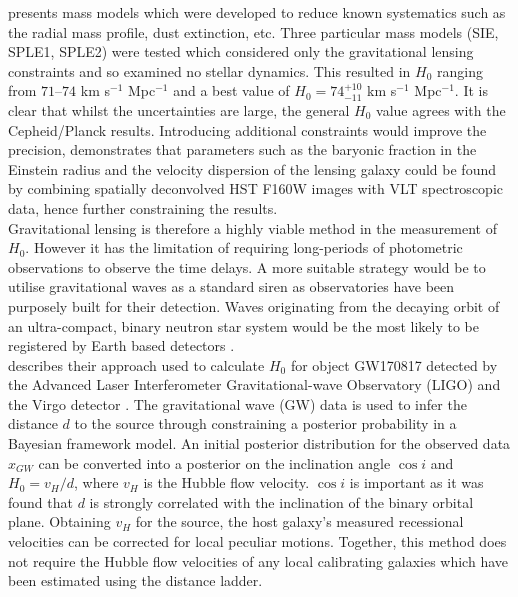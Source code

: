 \documentclass[12pt, onecolumn]{revtex4}    %
\begin{document}
\cite{2003ApJ...599...70K} presents mass models which were developed to reduce known systematics such as the radial mass profile, dust extinction, etc. Three particular mass models (SIE, SPLE1, SPLE2) were tested which considered only the gravitational lensing constraints and so examined no stellar dynamics. This resulted in $H_0$ ranging from $71$--$74$ km s$^{-1}$ Mpc$^{-1}$ and a best value of $H_0=74^{+10}_{-11}$ km s$^{-1}$ Mpc$^{-1}$. It is clear that whilst the uncertainties are large, the general $H_0$ value agrees with the Cepheid/Planck results. Introducing additional constraints would improve the precision, \cite{2011A&A...536A..53C} demonstrates that parameters such as the baryonic fraction in the Einstein radius and the velocity dispersion of the lensing galaxy could be found by combining spatially deconvolved HST F160W images with VLT spectroscopic data, hence further constraining the results. \\

Gravitational lensing is therefore a highly viable method in the measurement of $H_0$. However it has the limitation of requiring long-periods of photometric observations to observe the time delays. A more suitable strategy would be to utilise gravitational waves as a standard siren as observatories have been purposely built for their detection. Waves originating from the decaying orbit of an ultra-compact, binary neutron star system would be the most likely to be registered by Earth based detectors \citep{Schutz:1986aa}. \\

\cite{2017Natur.551...85A} describes their approach used to calculate $H_0$ for object GW170817 detected by the Advanced Laser Interferometer Gravitational-wave Observatory (LIGO) \citep{2015CQGra..32g4001L} and the Virgo detector \citep{2015CQGra..32b4001A}. The gravitational wave (GW) data is used to infer the distance $d$ to the source through constraining a posterior probability in a Bayesian framework model. An initial posterior distribution for the observed data $x_{GW}$ can be converted into a posterior on the inclination angle $\cos{i}$ and $H_0=v_H/d$, where $v_H$ is the Hubble flow velocity. $\cos{i}$ is important as it was found that $d$ is strongly correlated with the inclination of the binary orbital plane. Obtaining $v_H$ for the source, the host galaxy's measured recessional velocities can be corrected for local peculiar motions. Together, this method does not require the Hubble flow velocities of any local calibrating galaxies which have been estimated using the distance ladder. \\
\end{document}
